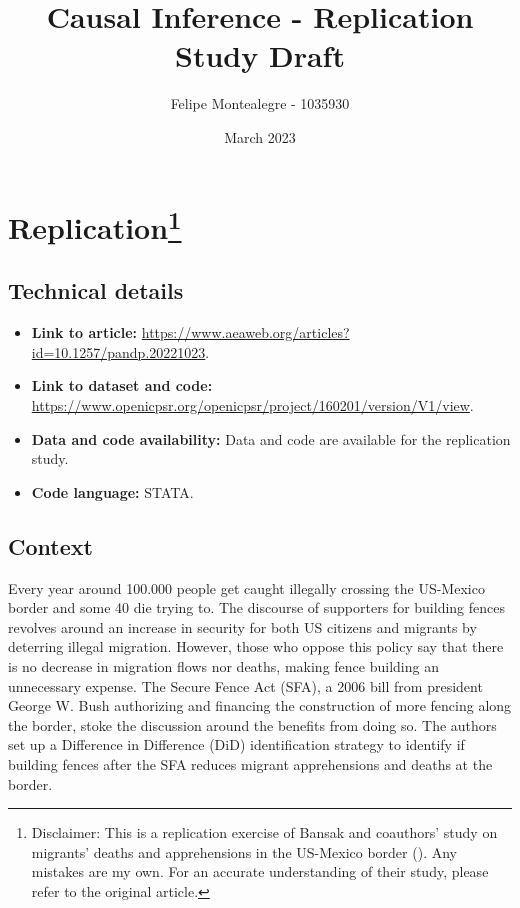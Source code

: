 \documentclass[titlepage]{article}
\begin{document}
\title{Causal Inference - Replication Study Draft}


\author[1]{Felipe Montealegre - 1035930}


\date{March 2023}

\maketitle

\section*{Replication\footnote{Disclaimer: This is a replication exercise of Bansak and coauthors’ study on migrants' deaths and apprehensions in the US-Mexico border (\cite{Bansak2022}). Any mistakes are my own. For an accurate understanding of their study, please refer to the original article.}}

\subsection*{Technical details}

\begin{itemize}
    \item \textbf{Link to article:} \href{https://www.aeaweb.org/articles?id=10.1257/pandp.20221023}{https://www.aeaweb.org/articles?id=10.1257/pandp.20221023}.
    \item \textbf{Link to dataset and code:} \href{https://www.openicpsr.org/openicpsr/project/160201/version/V1/view}{https://www.openicpsr.org/openicpsr/project/160201/version/V1/view}.
    \item \textbf{Data and code availability:} Data and code are available for the replication study.
    \item \textbf{Code language:} STATA.
\end{itemize}

\subsection*{Context}

Every year around 100.000 people get caught illegally crossing the US-Mexico border and some 40 die trying to. The discourse of supporters for building fences revolves around an increase in security for both US citizens and migrants by deterring illegal migration. However, those who oppose this policy say that there is no decrease in migration flows nor deaths, making fence building an unnecessary expense. The Secure Fence Act (SFA), a 2006 bill from president George W. Bush authorizing and financing the construction of more fencing along the border, stoke the discussion around the benefits from doing so. The authors set up a Difference in Difference (DiD) identification strategy to identify if building fences after the SFA reduces migrant apprehensions and deaths at the border.
\end{document}
